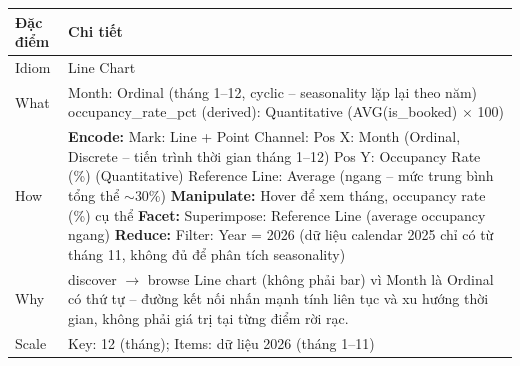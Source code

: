 \begin{longtable}{|p{2.8cm}|p{11.5cm}|}
\hline
\textbf{Đặc điểm} & \textbf{Chi tiết} \\
\hline
\endhead
\hline
\endfoot
Idiom & Line Chart \\
\hline
What & Month: Ordinal (tháng 1--12, cyclic -- seasonality lặp lại theo năm) \newline
occupancy\_rate\_pct (derived): Quantitative (AVG(is\_booked) $\times$ 100) \\
\hline
How & \textbf{Encode:} \newline
\newline
Mark: Line + Point \newline
Channel: \newline
\hspace{0.3cm} Pos X: Month (Ordinal, Discrete -- tiến trình thời gian tháng 1--12) \newline
\hspace{0.3cm} Pos Y: Occupancy Rate (\%) (Quantitative) \newline
\hspace{0.3cm} Reference Line: Average (ngang -- mức trung bình tổng thể $\sim$30\%) \newline
\newline
\textbf{Manipulate:} \newline
\newline
Hover để xem tháng, occupancy rate (\%) cụ thể \newline
\newline
\textbf{Facet:} \newline
\newline
Superimpose: Reference Line (average occupancy ngang) \newline
\newline
\textbf{Reduce:} \newline
\newline
Filter: Year = 2026 (dữ liệu calendar 2025 chỉ có từ tháng 11, không đủ để phân tích seasonality) \\
\hline
Why & discover $\rightarrow$ browse \newline
Line chart (không phải bar) vì Month là Ordinal có thứ tự -- đường kết nối nhấn mạnh tính liên tục và xu hướng thời gian, không phải giá trị tại từng điểm rời rạc. \\
\hline
Scale & Key: 12 (tháng); Items: dữ liệu 2026 (tháng 1--11) \\
\hline
\end{longtable}

